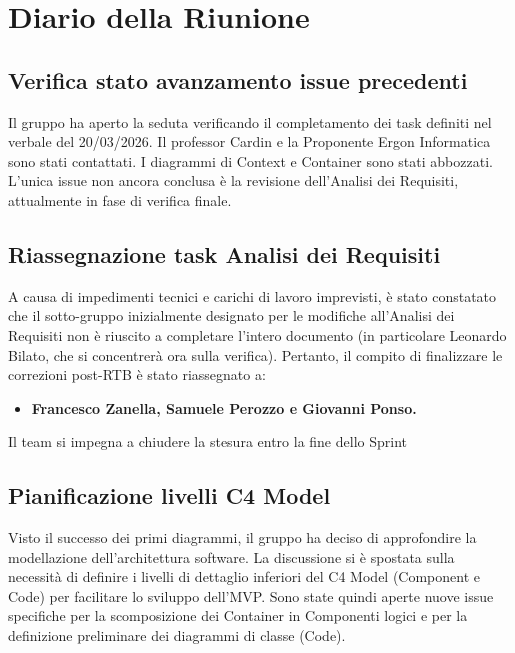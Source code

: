 \documentclass[a4paper, 11pt, oneside]{scrartcl} %
\begin{document}
\newpage
\section{Diario della Riunione}

\subsection{Verifica stato avanzamento issue precedenti}
Il gruppo ha aperto la seduta verificando il completamento dei task definiti nel verbale del 20/03/2026. Il professor Cardin e la Proponente Ergon Informatica sono stati contattati. I diagrammi di Context e Container sono stati abbozzati. L'unica issue non ancora conclusa è la revisione dell'Analisi dei Requisiti, attualmente in fase di verifica finale.

\subsection{Riassegnazione task Analisi dei Requisiti}
A causa di impedimenti tecnici e carichi di lavoro imprevisti, è stato constatato che il sotto-gruppo inizialmente designato per le modifiche all'Analisi dei Requisiti non è riuscito a completare l'intero documento (in particolare Leonardo Bilato, che si concentrerà ora sulla verifica). 
Pertanto, il compito di finalizzare le correzioni post-RTB è stato riassegnato a:
\begin{itemize}
    \item \textbf{Francesco Zanella, Samuele Perozzo e Giovanni Ponso.}
\end{itemize}
Il team si impegna a chiudere la stesura entro la fine dello Sprint

\subsection{Pianificazione livelli C4 Model}
Visto il successo dei primi diagrammi, il gruppo ha deciso di approfondire la modellazione dell'architettura software. La discussione si è spostata sulla necessità di definire i livelli di dettaglio inferiori del C4 Model (Component e Code) per facilitare lo sviluppo dell'MVP. Sono state quindi aperte nuove issue specifiche per la scomposizione dei Container in Componenti logici e per la definizione preliminare dei diagrammi di classe (Code).
\end{document}
